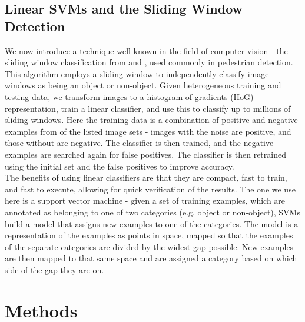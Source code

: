 \documentclass[twocolumn,longauthor]{aastex61}
\begin{document}
\subsection{Linear SVMs and the Sliding Window Detection} \label{subsec:window}
\noindent We now introduce a technique well known in the field of computer vision - the sliding window classification from \citet{2005CVPR} and \citet{2009IEEE}, used commonly in pedestrian detection. This algorithm employs a sliding window to independently classify image windows as being an object or non-object. Given heterogeneous training and testing data, we transform images to a histogram-of-gradients (HoG) representation, train a linear classifier, and use this to classify up to millions of sliding windows. Here the training data is a combination of positive and negative examples from of the listed image sets - images with the noise are positive, and those without are negative. The classifier is then trained, and the negative examples are searched again for false positives. The classifier is then retrained using the initial set and the false positives to improve accuracy.\\
\indent The benefits of using linear classifiers are that they are compact, fast to train, and fast to execute, allowing for quick verification of the results. The one we use here is a support vector machine - given a set of training examples, which are annotated as belonging to one of two categories (e.g. object or non-object), SVMs build a model that assigns new examples to one of the categories. The model is a representation of the examples as points in space, mapped so that the examples of the separate categories are divided by the widest gap possible. New examples are then mapped to that same space and are assigned a category based on which side of the gap they are on.



\section{Methods} \label{sec:methods}
\end{document}
